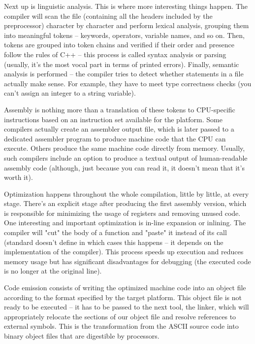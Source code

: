 Next up is linguistic analysis. This is where more interesting things happen. The compiler will scan the file (containing all the headers included by the preprocessor) character by character and perform lexical analysis, grouping them into meaningful tokens – keywords, operators, variable names, and so on. Then, tokens are grouped into token chains and verified if their order and presence follow the rules of C++ – this process is called syntax analysis or parsing (usually, it's the most vocal part in terms of printed errors). Finally, semantic analysis is performed – the compiler tries to detect whether statements in a file actually make sense. For example, they have to meet type correctness checks (you can't assign an integer to a string variable).

Assembly is nothing more than a translation of these tokens to CPU-specific instructions based on an instruction set available for the platform. Some compilers actually create an assembler output file, which is later passed to a dedicated assembler program to produce machine code that the CPU can execute. Others produce the same machine code directly from memory. Usually, such compilers include an option to produce a textual output of human-readable assembly code (although, just because you can read it, it doesn't mean that it's worth it).

Optimization happens throughout the whole compilation, little by little, at every stage.
There's an explicit stage after producing the first assembly version, which is responsible for minimizing the usage of registers and removing unused code. One interesting and important optimization is in-line expansion or inlining. The compiler will "cut" the body of a function and "paste" it instead of its call (standard doesn't define in which cases this happens – it depends on the implementation of the compiler). This process speeds up execution and reduces memory usage but has significant disadvantages for debugging (the executed code is no longer at the original line).

Code emission consists of writing the optimized machine code into an object file according to the format specified by the target platform. This object file is not ready to be executed – it has to be passed to the next tool, the linker, which will appropriately relocate the sections of our object file and resolve references to external symbols. This is the transformation from the ASCII source code into binary object files that are digestible by processors.

